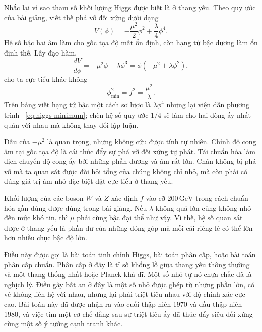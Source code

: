 \begin{classroomqa}
\end{classroomqa}

Nhắc lại vì sao tham số khối lượng Higgs được biết là ở thang yếu. Theo quy ước của bài giảng, viết thế phá vỡ đối xứng dưới dạng
\begin{equation}
V(\phi)=-\frac{\mu^2}{2}\phi^2+\frac{\lambda}{4}\phi^4.
\label{eq:higgs-potential}
\end{equation}
Hệ số bậc hai âm làm cho gốc tọa độ mất ổn định, còn hạng tứ bậc dương làm ổn định thế. Lấy đạo hàm,
\begin{equation}
\frac{dV}{d\phi}=-\mu^2\phi+\lambda\phi^3
=\phi(-\mu^2+\lambda\phi^2),
\end{equation}
cho ta cực tiểu khác không
\begin{equation}
\phi_{\min}^2=f^2=\frac{\mu^2}{\lambda}.
\label{eq:higgs-minimum}
\end{equation}
Trên bảng viết hạng tứ bậc một cách sơ lược là \(\lambda\phi^4\) nhưng lại viện dẫn phương trình ~\eqref{eq:higgs-minimum}; chèn hệ số quy ước \(1/4\) sẽ làm cho hai dòng ấy nhất quán với nhau mà không thay đổi lập luận.

Dấu của \(-\mu^2\) là quan trọng, nhưng không cứu được tính tự nhiên. Chính độ cong âm tại gốc tọa độ là cái thúc đẩy sự phá vỡ đối xứng tự phát. Tái chuẩn hóa làm dịch chuyển độ cong ấy bởi những phần dương và âm rất lớn. Chân không bị phá vỡ mà ta quan sát được đòi hỏi tổng của chúng không chỉ nhỏ, mà còn phải có đúng giá trị âm nhỏ đặc biệt đặt cực tiểu ở thang yếu.

Khối lượng của các boson \(W\) và \(Z\) xác định \(f\) vào cỡ \(200\,\mathrm{GeV}\) trong cách chuẩn hóa gần đúng được dùng trong bài giảng. Nếu \(\lambda\) không quá lớn cũng không nhỏ đến mức khó tin, thì \(\mu\) phải cùng bậc đại thể như vậy. Vì thế, hệ số quan sát được ở thang yếu là phần dư của những đóng góp mà mỗi cái riêng lẻ có thể lớn hơn nhiều chục bậc độ lớn.

Điều này được gọi là bài toán tinh chỉnh Higgs, bài toán phân cấp, hoặc bài toán phân cấp chuẩn. Phân cấp ở đây là tỉ số khổng lồ giữa thang yếu thông thường và một thang thống nhất hoặc Planck khả dĩ. Một số nhỏ tự nó chưa chắc đã là nghịch lý. Điều gây bất an ở đây là một số nhỏ được ghép từ những phần lớn, có vẻ không liên hệ với nhau, nhưng lại phải triệt tiêu nhau với độ chính xác cực cao. Bài toán này đã được nhận ra vào cuối thập niên 1970 và đầu thập niên 1980, và việc tìm một cơ chế đằng sau sự triệt tiêu ấy đã thúc đẩy siêu đối xứng cùng một số ý tưởng cạnh tranh khác.

